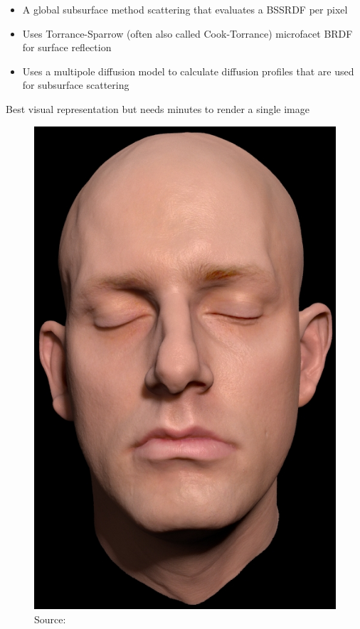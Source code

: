 \documentclass[ngerman,runningheads,a4paper]{llncs}[2018/03/10]
\begin{document}
             \begin{itemize}
              \item A global subsurface method scattering that evaluates a BSSRDF per pixel
              \item Uses Torrance-Sparrow (often also called Cook-Torrance) microfacet BRDF for surface reflection
              \item Uses a multipole diffusion model to calculate diffusion profiles that are used for subsurface scattering
            \end{itemize}

            Best visual representation but needs minutes to render a single image

            \begin{figure}[!h]
              \centering
              \includegraphics[scale=0.2,keepaspectratio]{./images/bssrdf-head.jpg}
              \caption{Source: \citet{spectral-bssrdf-human-skin}}
            \end{figure}
\end{document}
